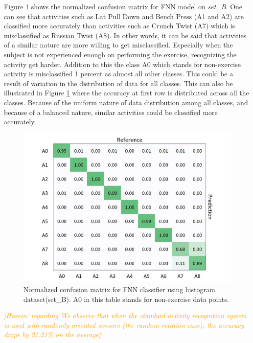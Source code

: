 \documentclass[journal,article,submit,moreauthors,pdftex]{Definitions/mdpi}
\newcommand{\hosein}[1]{\textcolor{orange}{{\it [Hosein: #1]}}}
\begin{document}
Figure \ref{fig:fnn_hbins_confusion_matrix} shows the normalized confusion matrix for FNN model on \textit{set\_B}. One can see that activities such as Lat Pull Down and Bench Press (A1 and A2) are classified more accurately than activities such as Crunch Twist (A7) which is misclassified as Russian Twist (A8). In other words, it can be said that activities of a similar nature are more willing to get misclassified. Especially when the subject is not experienced enough on performing the exercise, recognizing the activity get harder. Addition to this the class A0 which stands for non-exercise activity is misclassified 1 percent as almost all other classes. This could be a result of variation in the distribution of data for all classes. This can also be illustrated in Figure \ref{fig:fnn_hbins_confusion_matrix} where the accuracy at first row is distributed across all the classes. Because of the uniform nature of data distribution among all classes, and because of a balanced nature, similar activities could be classified more accurately.\\
\begin{figure}[H]
	\centering
	\includegraphics[width=7 cm]{Definitions/images/fnn_histogram_set.jpg}
	\caption{Normalized confusion matrix for FNN classifier using histogram dataset(set\_B). A0 in this table stands for non-exercise data points.}
	\label{fig:fnn_hbins_confusion_matrix}
\end{figure} 

\hosein{regarding We observe that when the standard activity recognition system is used with randomly oriented sensors (the random rotation case), the accuracy drops by 21.21\% on the average}
\end{document}

